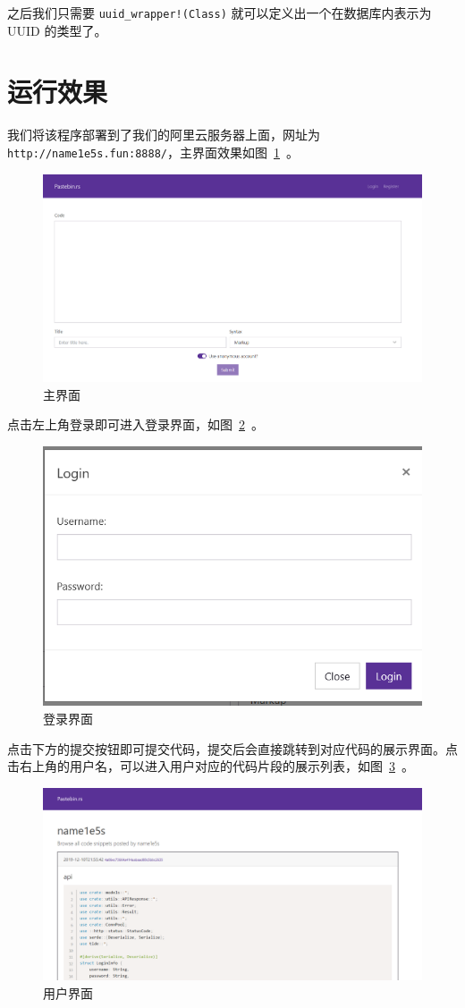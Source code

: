 \documentclass[ichigo,normal,cn]{elegantnote}
\newcommand{\code}[1]{\colorbox{light-gray}{\texttt{#1}}}
\begin{document}
之后我们只需要 \code{uuid\_wrapper!(Class)} 就可以定义出一个在数据库内表示为 UUID 的类型了。

\section{运行效果}

我们将该程序部署到了我们的阿里云服务器上面，网址为 \code{http://name1e5s.fun:8888/}，主界面效果如图~\ref{fig:main}~。

\begin{figure}[!htbp]
    \centering
    \includegraphics[width=.8\textwidth]{main}
    \caption{主界面}
    \label{fig:main}
\end{figure}

点击左上角登录即可进入登录界面，如图~\ref{fig:login}~。

\begin{figure}[!htbp]
    \centering
    \includegraphics[width=.5\textwidth]{login}
    \caption{登录界面}
    \label{fig:login}
\end{figure}

点击下方的提交按钮即可提交代码，提交后会直接跳转到对应代码的展示界面。点击右上角的用户名，可以进入用户对应的代码片段的展示列表，如图~\ref{fig:user}~。

\begin{figure}[!htbp]
    \centering
    \includegraphics[width=.8\textwidth]{user}
    \caption{用户界面}
    \label{fig:user}
\end{figure}
\end{document}
